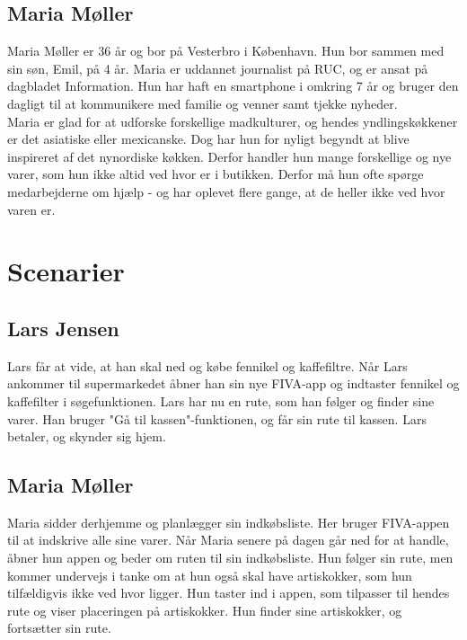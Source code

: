 \documentclass[12pt]{article}
\begin{document}
\subsection{Maria Møller}

\noindent Maria Møller er 36 år og bor på Vesterbro i København. Hun bor sammen med sin søn, Emil, på 4 år. Maria er uddannet journalist på RUC, og er ansat på dagbladet Information. Hun har haft en smartphone i omkring 7 år og bruger den dagligt til at kommunikere med familie og venner samt tjekke nyheder.\\

\noindent Maria er glad for at udforske forskellige madkulturer, og hendes yndlingskøkkener er det asiatiske eller mexicanske. Dog har hun for nyligt begyndt at blive inspireret af det nynordiske køkken. Derfor handler hun mange forskellige og nye varer, som hun ikke altid ved hvor er i butikken. Derfor må hun ofte spørge medarbejderne om hjælp - og har oplevet flere gange, at de heller ikke ved hvor varen er.

\section{Scenarier}

\subsection{Lars Jensen}
Lars får at vide, at han skal ned og købe fennikel og kaffefiltre. Når Lars ankommer til supermarkedet åbner han sin nye FIVA-app og indtaster fennikel og kaffefilter i søgefunktionen. Lars har nu en rute, som han følger og finder sine varer. Han bruger "Gå til kassen"-funktionen, og får sin rute til kassen. Lars betaler, og skynder sig hjem.

\subsection{Maria Møller}
Maria sidder derhjemme og planlægger sin indkøbsliste. Her bruger FIVA-appen til at indskrive alle sine varer. Når Maria senere på dagen går ned for at handle, åbner hun appen og beder om ruten til sin indkøbsliste. Hun følger sin rute, men kommer undervejs i tanke om at hun også skal have artiskokker, som hun tilfældigvis ikke ved hvor ligger. Hun taster ind i appen, som tilpasser til hendes rute og viser placeringen på artiskokker. Hun finder sine artiskokker, og fortsætter sin rute.

\newpage
\end{document}
